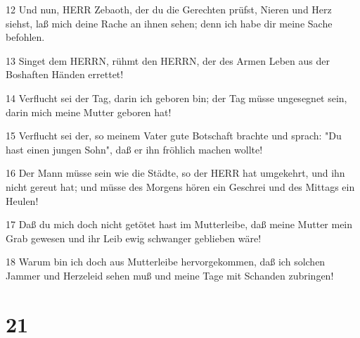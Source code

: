 \par 12 Und nun, HERR Zebaoth, der du die Gerechten prüfst, Nieren und Herz siehst, laß mich deine Rache an ihnen sehen; denn ich habe dir meine Sache befohlen.
\par 13 Singet dem HERRN, rühmt den HERRN, der des Armen Leben aus der Boshaften Händen errettet!
\par 14 Verflucht sei der Tag, darin ich geboren bin; der Tag müsse ungesegnet sein, darin mich meine Mutter geboren hat!
\par 15 Verflucht sei der, so meinem Vater gute Botschaft brachte und sprach: "Du hast einen jungen Sohn", daß er ihn fröhlich machen wollte!
\par 16 Der Mann müsse sein wie die Städte, so der HERR hat umgekehrt, und ihn nicht gereut hat; und müsse des Morgens hören ein Geschrei und des Mittags ein Heulen!
\par 17 Daß du mich doch nicht getötet hast im Mutterleibe, daß meine Mutter mein Grab gewesen und ihr Leib ewig schwanger geblieben wäre!
\par 18 Warum bin ich doch aus Mutterleibe hervorgekommen, daß ich solchen Jammer und Herzeleid sehen muß und meine Tage mit Schanden zubringen!

\chapter{21}

